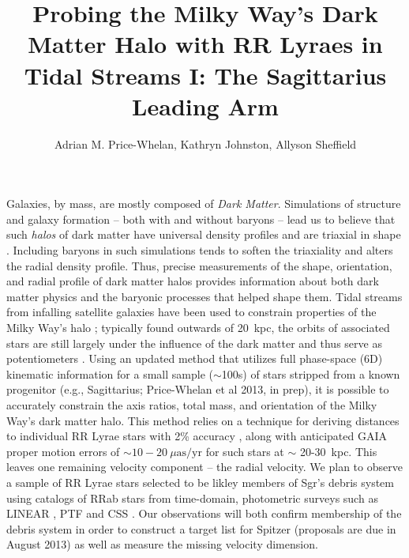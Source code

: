 \documentclass[preprint]{aastex}
\begin{document}
\title{Probing the Milky Way's Dark Matter Halo with RR Lyraes in
  Tidal Streams I: The Sagittarius Leading Arm} \author{Adrian M.
  Price-Whelan, Kathryn Johnston,
  Allyson Sheffield} 

Galaxies, by mass, are mostly composed of \emph{Dark
  Matter}. Simulations of structure and galaxy formation -- both with
and without baryons -- lead us to believe that such \emph{halos} of
dark matter have universal density profiles \citep{nfw96} and are
triaxial in shape \citep{jing02}. Including baryons in such
simulations tends to soften the triaxiality and alters the radial
density profile. Thus, precise measurements of the shape, orientation,
and radial profile of dark matter halos provides information about
both dark matter physics and the baryonic processes that helped shape
them. Tidal streams from infalling satellite galaxies have been used
to constrain properties of the Milky Way's halo \citep[e.g.][]{law10};
typically found outwards of 20~kpc, the orbits of associated stars are
still largely under the influence of the dark matter and thus serve as
potentiometers \citep[e.g.][]{johnston99}. Using an updated method
that utilizes full phase-space (6D) kinematic information for a small
sample ($\sim$100s) of stars stripped from a known progenitor (e.g.,
Sagittarius; Price-Whelan et al 2013, in prep), it is possible to
accurately constrain the axis ratios, total mass, and orientation of
the Milky Way's dark matter halo. This method relies on a technique
for deriving distances to individual RR Lyrae stars with 2\% accuracy
\citep{madore12}, along with anticipated GAIA proper motion errors of
$\sim10-20~\mu\mathrm{as}/\mathrm{yr}$ for such stars at $\sim$
20-30~kpc. This leaves one remaining velocity component -- the radial
velocity.  We plan to observe a sample of RR Lyrae stars selected to
be likley members of Sgr's debris system using catalogs of RRab stars
from time-domain, photometric surveys such as LINEAR \citep{linear}, PTF
\citep{ptf} and CSS \citep{catalina}.  Our observations will both confirm
membership of the debris system in order to construct a target list
for Spitzer (proposals are due in August 2013) as well as measure the
missing velocity dimension.
\end{document}
